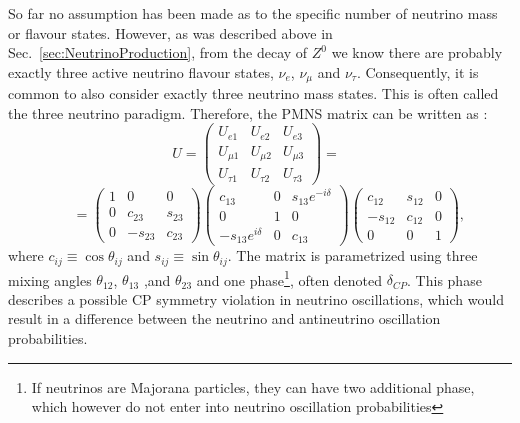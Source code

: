 So far no assumption has been made as to the specific number of neutrino mass or flavour states. However, as was described above in Sec.~\ref{sec:NeutrinoProduction}, from the decay of $Z^0$ we know there are probably exactly three active neutrino flavour states, $\nu_e$, $\nu_\mu$ and $\nu_\tau$. Consequently, it is common to also consider exactly three neutrino mass states. This is often called the three neutrino paradigm. Therefore, the \gls{PMNS} matrix can be written as \cite{FundamentalsOfNeutrinoPhysics.pdf}:
\[
U=
\begin{pmatrix}
 U_{e1}     & U_{e2}     & U_{e3}    \\
 U_{\mu 1}  & U_{\mu 2}  & U_{\mu 3} \\
 U_{\tau 1} & U_{\tau 2} & U_{\tau 3}
\end{pmatrix}
=\,\,\,
\]
\begin{equation}\label{param3}
\,\,\,\,\,\,\,\, =
\begin{pmatrix}
 1 & 0       & 0      \\
 0 & c_{23}  & s_{23} \\
 0 & -s_{23} & c_{23}
\end{pmatrix}
\begin{pmatrix}
 c_{13}              & 0 & s_{13}e^{-i\delta} \\
 0                   & 1 & 0                  \\
 -s_{13}e^{i\delta} & 0 & c_{13}
\end{pmatrix}
\begin{pmatrix}
 c_{12}  & s_{12} & 0 \\
 -s_{12} & c_{12} & 0 \\
 0       & 0      & 1
\end{pmatrix},
\end{equation}
where $c_{ij}\equiv\cos\theta_{ij}$ and $s_{ij}\equiv\sin\theta_{ij}$. The matrix is parametrized using three mixing angles $\theta_{12}$, $\theta_{13}$ ,and $\theta_{23}$ and one phase\footnote{If neutrinos are Majorana particles, they can have two additional phase, which however do not enter into neutrino oscillation probabilities}, often denoted $\delta_{CP}$. This phase describes a possible \gls{CP} symmetry violation in neutrino oscillations, which would result in a difference between the neutrino and antineutrino oscillation probabilities.

